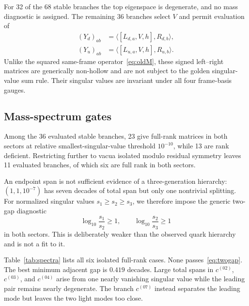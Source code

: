 \documentclass[11pt]{article}
\begin{document}
For 32 of the 68 stable branches the top eigenspace is degenerate, and no mass diagnostic is assigned.  The remaining 36 branches select $V$ and permit evaluation of
\begin{align}
  (Y_d)_{ab}&=\langle[L_{d,a},V,h],R_{d,b}\rangle,\label{eq:Yd}\\
  (Y_u)_{ab}&=\langle[L_{u,a},V,h],R_{u,b}\rangle.\label{eq:Yu}
\end{align}
Unlike the squared same-frame operator~\eqref{eq:oldM}, these signed left--right matrices are generically non-hollow and are not subject to the golden singular-value sum rule.  Their singular values are invariant under all four frame-basis gauges.

\subsection{Mass-spectrum gates}

Among the 36 evaluated stable branches, 23 give full-rank matrices in both sectors at relative smallest-singular-value threshold $10^{-10}$, while 13 are rank deficient.  Restricting further to vacua isolated modulo residual symmetry leaves 11 evaluated branches, of which six are full rank in both sectors.

An endpoint span is not sufficient evidence of a three-generation hierarchy: $(1,1,10^{-7})$ has seven decades of total span but only one nontrivial splitting.  For normalized singular values $s_1\ge s_2\ge s_3$, we therefore impose the generic two-gap diagnostic
\begin{equation}
  \log_{10}\frac{s_1}{s_2}\ge1,
  \qquad
  \log_{10}\frac{s_2}{s_3}\ge1
  \label{eq:twogap}
\end{equation}
in both sectors.  This is deliberately weaker than the observed quark hierarchy and is not a fit to it.

Table~\ref{tab:spectra} lists all six isolated full-rank cases.  None passes~\eqref{eq:twogap}.  The best minimum adjacent gap is $0.419$ decades.  Large total spans in $c^{(02)}$, $c^{(03)}$, and $c^{(04)}$ arise from one nearly vanishing singular value while the leading pair remains nearly degenerate.  The branch $c^{(07)}$ instead separates the leading mode but leaves the two light modes too close.
\end{document}
